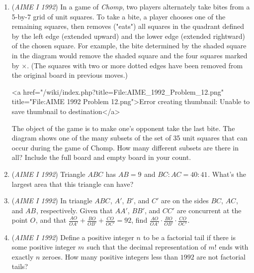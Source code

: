 \begin{enumerate}
 

	\item (\textit{AIME I 1992}) In a game of \textit{Chomp}, two players alternately take bites from a 5-by-7 grid of unit squares. To take a bite, a player chooses one of the remaining squares, then removes ("eats") all squares in the quadrant defined by the left edge (extended upward) and the lower edge (extended rightward) of the chosen square. For example, the bite determined by the shaded square in the diagram would remove the shaded square and the four squares marked by $\times.$ (The squares with two or more dotted edges have been removed from the original board in previous moves.) 


 <a href="/wiki/index.php?title=File:AIME\_1992\_Problem\_12.png" title="File:AIME 1992 Problem 12.png">Error creating thumbnail: Unable to save thumbnail to destination</a>


 The object of the game is to make one's opponent take the last bite. The diagram shows one of the many subsets of the set of 35 unit squares that can occur during the game of Chomp. How many different subsets are there in all? Include the full board and empty board in your count.


 

	\item (\textit{AIME I 1992}) Triangle $ABC^{}_{}$ has $AB=9^{}_{}$ and $BC: AC=40: 41^{}_{}$. What's the largest area that this triangle can have?


 

	\item (\textit{AIME I 1992}) In triangle $ABC^{}_{}$, $A'$, $B'$, and $C'$ are on the sides $BC$, $AC^{}_{}$, and $AB^{}_{}$, respectively. Given that $AA'$, $BB'$, and $CC'$ are concurrent at the point $O^{}_{}$, and that $\frac{AO^{}_{}}{OA'}+\frac{BO}{OB'}+\frac{CO}{OC'}=92$, find $\frac{AO}{OA'}\cdot \frac{BO}{OB'}\cdot \frac{CO}{OC'}$.


 

	\item (\textit{AIME I 1992}) Define a positive integer $n^{}_{}$ to be a factorial tail if there is some positive integer $m^{}_{}$ such that the decimal representation of $m!$ ends with exactly $n$ zeroes. How many positive integers less than $1992$ are not factorial tails?


 

\end{enumerate}